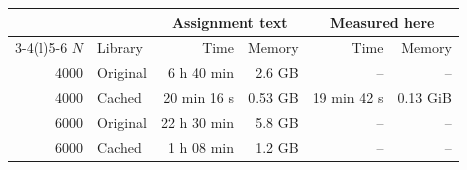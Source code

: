 \begin{tabular}{@{}r l r r r r@{}}
\toprule
& & \multicolumn{2}{c}{Assignment text} & \multicolumn{2}{c}{Measured here} \\
\cmidrule(lr){3-4}\cmidrule(l){5-6}
$N$ & Library & Time & Memory & Time & Memory \\
\midrule
4000 & Original & 6 h 40 min & 2.6 GB & -- & -- \\
4000 & Cached & 20 min 16 s & 0.53 GB & 19 min 42 s & 0.13 GiB \\
6000 & Original & 22 h 30 min & 5.8 GB & -- & -- \\
6000 & Cached & 1 h 08 min & 1.2 GB & -- & -- \\
\bottomrule
\end{tabular}
